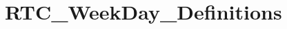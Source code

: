 \hypertarget{group___r_t_c___week_day___definitions}{\section{R\-T\-C\-\_\-\-Week\-Day\-\_\-\-Definitions}
\label{group___r_t_c___week_day___definitions}
}
